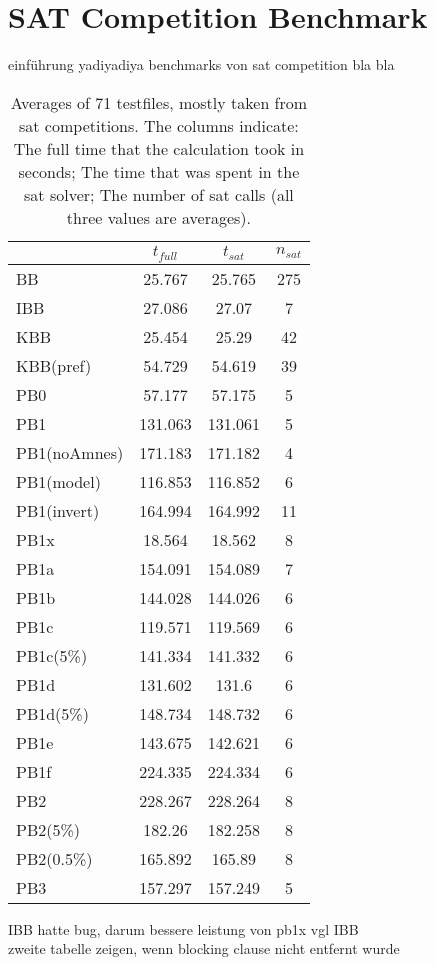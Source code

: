\section{SAT Competition Benchmark}

einführung yadiyadiya benchmarks von sat competition bla bla

\begin{table} %
\label{tab:satCompAvg} %
\begin{tabular}{l| c c c }
 & $t_{full}$ & $t_{sat}$ & $n_{sat}$ \\
 \hline
BB & 25.767 & 25.765 & 275 \\
IBB & 27.086 & 27.07 & 7 \\
KBB & 25.454 & 25.29 & 42 \\
KBB(pref) & 54.729 & 54.619 & 39 \\
PB0 & 57.177 & 57.175 & 5 \\
PB1 & 131.063 & 131.061 & 5 \\
PB1(noAmnes) & 171.183 & 171.182 & 4 \\
PB1(model) & 116.853 & 116.852 & 6 \\
PB1(invert) & 164.994 & 164.992 & 11 \\
PB1x & 18.564 & 18.562 & 8 \\
PB1a & 154.091 & 154.089 & 7 \\
PB1b & 144.028 & 144.026 & 6 \\
PB1c & 119.571 & 119.569 & 6 \\
PB1c(5\%) & 141.334 & 141.332 & 6 \\
PB1d & 131.602 & 131.6 & 6 \\
PB1d(5\%) & 148.734 & 148.732 & 6 \\
PB1e & 143.675 & 142.621 & 6 \\
PB1f & 224.335 & 224.334 & 6 \\
PB2 & 228.267 & 228.264 & 8 \\
PB2(5\%) & 182.26 & 182.258 & 8 \\
PB2(0.5\%) & 165.892 & 165.89 & 8 \\
PB3 & 157.297 & 157.249 & 5
\end{tabular}
\caption{Averages of 71 testfiles, mostly taken from sat competitions. The columns indicate: The full time that the calculation took in seconds; The time that was spent in the sat solver; The number of sat calls (all three values are averages). }
\end{table}


IBB hatte bug, darum bessere leistung von pb1x vgl IBB\\
zweite tabelle zeigen, wenn blocking clause nicht entfernt wurde



